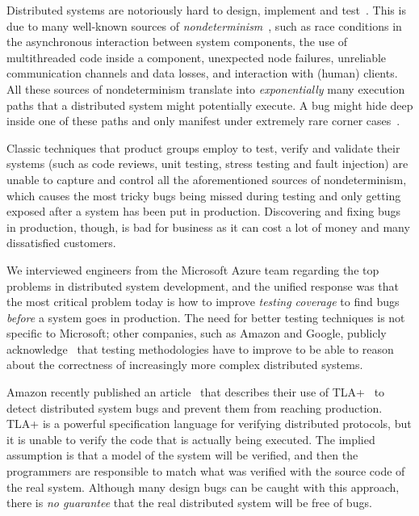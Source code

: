 Distributed systems are notoriously hard to design, implement and test~\cite{cavage2013there, maddox2015test}. This is due to many well-known sources of \emph{nondeterminism}~\cite{chandra2007paxos}, such as race conditions in the asynchronous interaction between system components, the use of multithreaded code inside a component, unexpected node failures, unreliable communication channels and data losses, and interaction with (human) clients.
%
All these sources of nondeterminism translate into \emph{exponentially} many execution paths that a distributed system might potentially execute. A bug might hide deep inside one of these paths and only manifest under extremely rare corner cases~\cite{gray1986computers, musuvathi2008finding}.

Classic techniques that product groups employ to test, verify and validate their systems (such as code reviews, unit testing, stress testing and fault injection) are unable to capture and control all the aforementioned sources of nondeterminism, which causes the most tricky bugs being missed during testing and only getting exposed after a system has been put in production. Discovering and fixing bugs in production, though, is bad for business as it can cost a lot of money and many dissatisfied customers.

We interviewed engineers from the Microsoft Azure team regarding the top problems in distributed system development, and the unified response was that the most critical problem today is how to improve \emph{testing coverage} to find bugs \emph{before} a system goes in production. The need for better testing techniques is not specific to Microsoft; other companies, such as Amazon and Google, publicly acknowledge~\cite{newcombe2015aws} that testing methodologies have to improve to be able to reason about the correctness of increasingly more complex distributed systems.

Amazon recently published an article~\cite{newcombe2015aws} that describes their use of TLA+~\cite{lamport1994temporal} to detect distributed system bugs and prevent them from reaching production. TLA+ is a powerful specification language for verifying distributed protocols, but it is unable to verify the code that is actually being executed. The implied assumption is that a model of the system will be verified, and then the programmers are responsible to match what was verified with the source code of the real system. Although many design bugs can be caught with this approach, there is \emph{no guarantee} that the real distributed system will be free of bugs.

